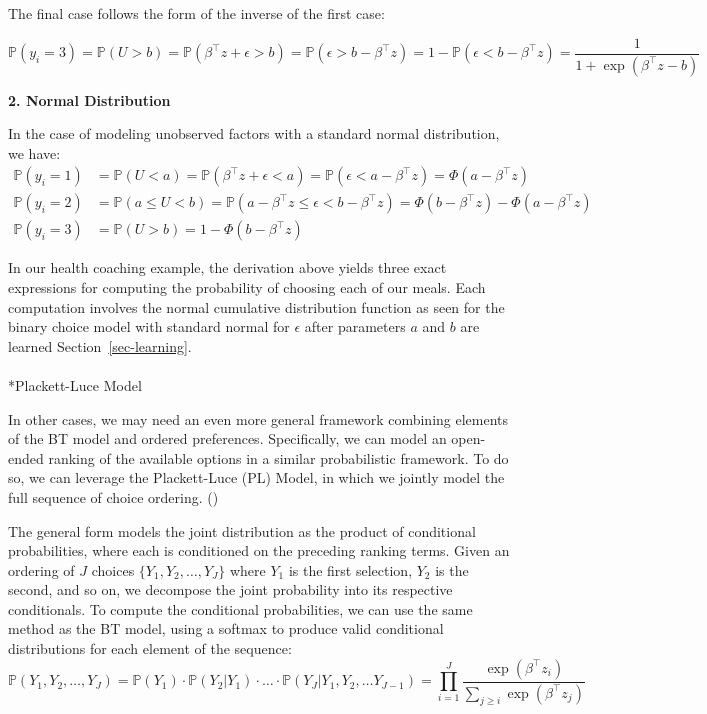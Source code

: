 \documentclass[
  letterpaper,
  numbers=noenddot,
  DIV=11]{scrreprt}
\makeatletter
\let\oldparagraph\paragraph
\renewcommand{\paragraph}{
    \@ifstar
      \xxxParagraphStar
      \xxxParagraphNoStar
  }
\newcommand{\xxxParagraphStar}[1]{\oldparagraph*{#1}\mbox{}}
\newcommand{\xxxParagraphNoStar}[1]{\oldparagraph{#1}\mbox{}}
\theoremstyle{definition}
\theoremstyle{plain}
\theoremstyle{plain}
\theoremstyle{remark}
\makeatother
\begin{document}
The final case follows the form of the inverse of the first case:

\[\mathbb{P}(y_i = 3) = \mathbb{P}(U > b) = \mathbb{P}(\beta^\top z + \epsilon > b ) = \mathbb{P}( \epsilon > b - \beta^\top z) = 1 - \mathbb{P}( \epsilon < b - \beta^\top z) = \frac{1}{1 + \exp(\beta^\top z - b)}\]

\textbf{2. Normal Distribution}

In the case of modeling unobserved factors with a standard normal
distribution, we have: \[\begin{split}
    \mathbb{P}(y_i = 1) & = \mathbb{P}(U < a) = \mathbb{P}(\beta^\top z + \epsilon < a ) = \mathbb{P}( \epsilon < a - \beta^\top z) = \Phi(a - \beta^\top z) \\
    \mathbb{P}(y_i = 2) & = \mathbb{P}(a \le U < b) 
    = \mathbb{P}(a - \beta^\top z \le \epsilon < b - \beta^\top z) = \Phi(b - \beta^\top z) - \Phi(a - \beta^\top z) \\
    \mathbb{P}(y_i = 3) & = \mathbb{P}(U > b) 
    = 1 - \Phi(b - \beta^\top z) 
\end{split}\]

In our health coaching example, the derivation above yields three exact
expressions for computing the probability of choosing each of our meals.
Each computation involves the normal cumulative distribution function as
seen for the binary choice model with standard normal for \(\epsilon\)
after parameters \(a\) and \(b\) are learned Section~\ref{sec-learning}.

\paragraph*{Plackett-Luce Model}\label{plackett-luce-model}

In other cases, we may need an even more general framework combining
elements of the BT model and ordered preferences. Specifically, we can
model an open-ended ranking of the available options in a similar
probabilistic framework. To do so, we can leverage the Plackett-Luce
(PL) Model, in which we jointly model the full sequence of choice
ordering. ()

The general form models the joint distribution as the product of
conditional probabilities, where each is conditioned on the preceding
ranking terms. Given an ordering of \(J\) choices
\(\{Y_1, Y_2, \dots, Y_J\}\) where \(Y_1\) is the first selection,
\(Y_2\) is the second, and so on, we decompose the joint probability
into its respective conditionals. To compute the conditional
probabilities, we can use the same method as the BT model, using a
softmax to produce valid conditional distributions for each element of
the sequence:
\[\mathbb{P}(Y_1, Y_2, \dots, Y_J) = \mathbb{P}(Y_1) \cdot \mathbb{P}(Y_2 | Y_1) \cdot \dots \cdot \mathbb{P}(Y_J | Y_1, Y_2, \dots Y_{J - 1}) = \prod_{i = 1}^J \frac{\exp(\beta^\top z_i)}{\sum_{j \ge i} \exp(\beta^\top z_j)}\]
\end{document}
